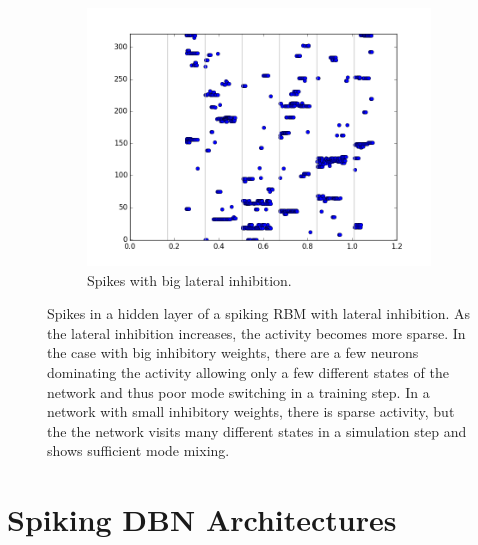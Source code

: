 \begin{figure}[h!]
	\begin{subfigure}[t]{.55\textwidth}
  		\centering
  		\includegraphics[width=.9\linewidth]{imgs/app/inhib_big.png}
  		\caption{Spikes with big lateral inhibition.}
  		\label{fig:sub2}
	\end{subfigure}
	\caption[Spikes in a hidden layer of a spiking RBM with different kinds of lateral inhibition.]{Spikes in a hidden layer of a spiking RBM with lateral inhibition. As the lateral inhibition increases, the activity becomes more sparse. In the case with big inhibitory weights, there are a few neurons dominating the activity allowing only a few different states of the network and thus poor mode switching in a training step. In a network with small inhibitory weights, there is sparse activity, but the the network visits many different states in a simulation step and shows sufficient mode mixing. }
	\label{fig:dbnmixing}
\end{figure}
   
\section{Spiking DBN Architectures}   
   
